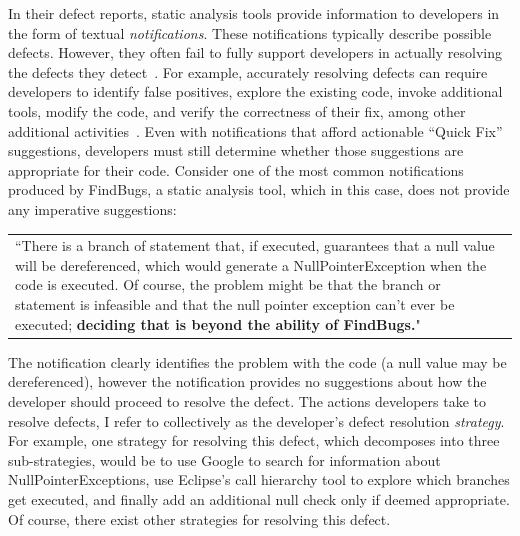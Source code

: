 \documentclass{sig-alternate}
\begin{document}
In their defect reports, static analysis tools provide information to developers in the form of textual \textit{notifications}.
These notifications typically describe possible defects.
However, they often fail to fully support developers in actually resolving the defects they detect~\cite{Johnson2013}.
For example, accurately resolving defects can require developers to identify false positives, explore the existing code, invoke additional tools, modify the code, and verify the correctness of their fix, among other additional activities~\cite{Smith2015}.  
Even with notifications that afford actionable ``Quick Fix'' suggestions, developers must still determine whether those suggestions are appropriate for their code.
Consider one of the most common \cite{Ayewah2007} notifications produced by FindBugs, a static analysis tool, which in this case, does not provide any imperative suggestions:


\vspace{2mm}

\begin{tabular}{|p{7.5cm}}
	``There is a branch of statement that, if executed, guarantees that a null value will be dereferenced, which would generate a NullPointerException when the code is executed. Of course, the problem might be that the branch or statement is infeasible and that the null pointer exception can't ever be executed; \textbf{deciding that is beyond the ability of FindBugs.}"\\
\end{tabular}
\vspace{2mm}

\noindent
The notification clearly identifies the problem with the code (a null value may be dereferenced), however the notification provides no suggestions about how the developer should proceed to resolve the defect. 
The actions developers take to resolve defects, I refer to collectively as the developer's defect resolution \textit{strategy}.
For example, one strategy for resolving this defect, which decomposes into three sub-strategies, would be to use Google to search for information about NullPointerExceptions, use Eclipse's call hierarchy tool to explore which branches get executed, and finally add an additional null check only if deemed appropriate.
Of course, there exist other strategies for resolving this defect.
\end{document}
